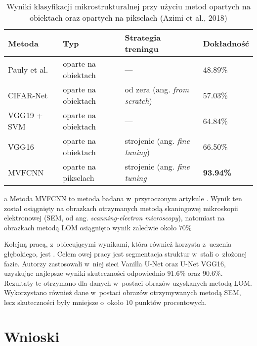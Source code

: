 \begin{table}[h]
	\centering
	\begin{threeparttable}
		\caption{Wyniki klasyfikacji mikrostrukturalnej przy użyciu metod opartych na obiektach oraz opartych na pikselach (Azimi et al., 2018)}
		\label{tab:tab1}
		\begin{tabularx}{1\textwidth}{ |X|X|X|X| }
  \hline
   \textbf{Metoda} & \textbf{Typ} & \textbf{Strategia treningu} & \textbf{Dokładność}\\
  \hline
  Pauly et al. \cite{Pauly16} & oparte na obiektach & — & 48.89\%\\
  \hline
  CIFAR-Net & oparte na obiektach & od zera (ang. \textit{from scratch}) & 57.03\%\\
  \hline
  VGG19 + SVM & oparte na obiektach & — & 64.84\%\\
  \hline
  VGG16 & oparte na obiektach & strojenie (ang. \textit{fine tuning}) & 66.50\%\\
  \hline
  MVFCNN\tnote{a} & oparte na pikselach & strojenie (ang. \textit{fine tuning} & \textbf{93.94\%}\\
  \hline
\end{tabularx}
		\begin{tablenotes}
			\footnotesize
			\item[a] Metoda MVFCNN to metoda badana w~przytoczonym artykule \cite{Azimi18}. Wynik ten został osiągnięty na obrazkach otrzymanych metodą skaningowej mikroskopii elektronowej (SEM, od ang. \textit{scanning-electron microscopy}), natomiast na obrazkach metodą LOM osiągnięto wynik zaledwie około 70\%\textellipsis
		\end{tablenotes}
	\end{threeparttable}
\end{table}

Kolejną pracą, z~obiecującymi wynikami, która również korzysta z~uczenia głębokiego, jest \cite{Durmaz21}. Celem owej pracy jest segmentacja struktur w~stali o~złożonej fazie. Autorzy zastosowali w~niej sieci Vanilla U-Net oraz U-Net VGG16, uzyskując najlepsze wyniki skuteczności odpowiednio $91.6\%$ oraz $90.6\%$. Rezultaty te otrzymano dla danych w~postaci obrazów uzyskanych metodą LOM. Wykorzystano również dane w~postaci obrazów otrzymywanych metodą SEM, lecz skuteczności były mniejsze o~około $10$ punktów procentowych.

\section{Wnioski}
\label{cha2.3}

